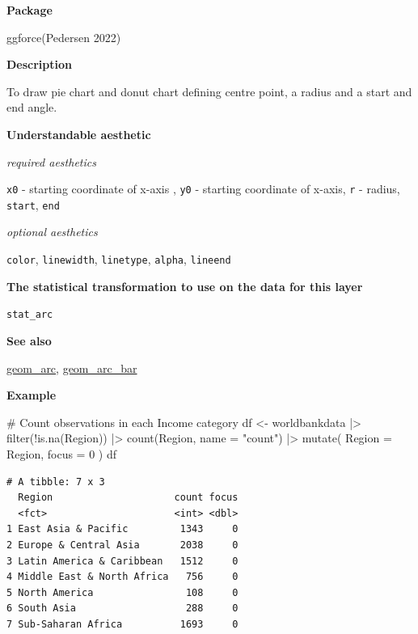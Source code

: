 \documentclass[
  letterpaper,
  DIV=11,
  numbers=noendperiod]{scrreprt}
\newenvironment{Shaded}{\begin{snugshade}}{\end{snugshade}}
\newcommand{\AttributeTok}[1]{\textcolor[rgb]{0.40,0.45,0.13}{#1}}
\newcommand{\CommentTok}[1]{\textcolor[rgb]{0.37,0.37,0.37}{#1}}
\newcommand{\DecValTok}[1]{\textcolor[rgb]{0.68,0.00,0.00}{#1}}
\newcommand{\FunctionTok}[1]{\textcolor[rgb]{0.28,0.35,0.67}{#1}}
\newcommand{\NormalTok}[1]{\textcolor[rgb]{0.00,0.23,0.31}{#1}}
\newcommand{\OtherTok}[1]{\textcolor[rgb]{0.00,0.23,0.31}{#1}}
\newcommand{\SpecialCharTok}[1]{\textcolor[rgb]{0.37,0.37,0.37}{#1}}
\newcommand{\StringTok}[1]{\textcolor[rgb]{0.13,0.47,0.30}{#1}}
\begin{document}
\textbf{Package}

ggforce(Pedersen 2022)

\textbf{Description}

To draw pie chart and donut chart defining centre point, a radius and a
start and end angle.

\textbf{Understandable aesthetic}

\emph{required aesthetics}

\texttt{x0} - starting coordinate of x-axis , \texttt{y0} - starting
coordinate of x-axis, \texttt{r} - radius, \texttt{start}, \texttt{end}

\emph{optional aesthetics}

\texttt{color}, \texttt{linewidth}, \texttt{linetype}, \texttt{alpha},
\texttt{lineend}

\textbf{The statistical transformation to use on the data for this
layer}

\texttt{stat\_arc}

\textbf{See also}

\hyperref[arc]{geom\_arc}, \hyperref[arcbar]{geom\_arc\_bar}

\textbf{Example}

\begin{Shaded}
\begin{Highlighting}[]
\CommentTok{\# Count observations in each Income category}
\NormalTok{df }\OtherTok{\textless{}{-}}\NormalTok{ worldbankdata }\SpecialCharTok{|\textgreater{}}
  \FunctionTok{filter}\NormalTok{(}\SpecialCharTok{!}\FunctionTok{is.na}\NormalTok{(Region)) }\SpecialCharTok{|\textgreater{}}
  \FunctionTok{count}\NormalTok{(Region, }\AttributeTok{name =} \StringTok{"count"}\NormalTok{) }\SpecialCharTok{|\textgreater{}}
  \FunctionTok{mutate}\NormalTok{(}
    \AttributeTok{Region =}\NormalTok{ Region,}
    \AttributeTok{focus =} \DecValTok{0}
\NormalTok{  )}
\NormalTok{df}
\end{Highlighting}
\end{Shaded}

\begin{verbatim}
# A tibble: 7 x 3
  Region                     count focus
  <fct>                      <int> <dbl>
1 East Asia & Pacific         1343     0
2 Europe & Central Asia       2038     0
3 Latin America & Caribbean   1512     0
4 Middle East & North Africa   756     0
5 North America                108     0
6 South Asia                   288     0
7 Sub-Saharan Africa          1693     0
\end{verbatim}
\end{document}
